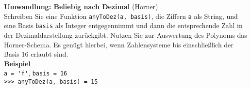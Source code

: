 \textbf{Umwandlung: Beliebig nach Dezimal} (Horner)\\
Schreiben Sie eine Funktion \verb|anyToDez(a, basis)|, die Ziffern \verb|a| als String, und eine Basis \verb|basis| als Integer entgegennimmt und dann die entsprechende Zahl in der Dezimaldarstellung zurückgibt. Nutzen Sie zur Auswertung des Polynoms das Horner-Schema. Es genügt hierbei, wenn Zahlensysteme bis einschließlich der Basis 16 erlaubt sind.\\

\textbf{Beispiel} \\
\verb|a = 'f'|, \verb|basis = 16| \\
\verb|>>> anyToDez(a, basis) = 15|